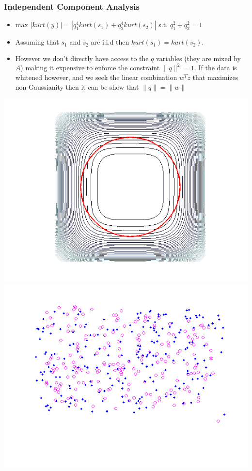 \documentclass{beamer}
\begin{document}
\begin{frame} 
\frametitle{Independent Component Analysis} 
\begin{itemize}
\item{max $|kurt(y)| = |q_1 ^ 4 kurt(s_1) + q_2 ^ 4kurt(s_2)|$ s.t. $q_1 ^ 2 + q_2 ^2 = 1$} 
\item{Assuming that $s_1$ and $s_2$ are i.i.d then $kurt(s_1) = kurt(s_2)$}. 
\item{However we don't directly have access to the $q$ variables (they are mixed by $A$) making it expensive to enforce the constraint $\|q\|^2 =1$. If the data is whitened however, and we seek the linear combination $w^Tz$ that maximizes non-Gaussianity then it can be show that $\|q\| = \|w\|$} 
\end{itemize}
\begin{center}
\includegraphics[scale = 0.3]{ICA.png}
\includegraphics[scale = 0.3]{ICAresult1.png}
\end{center}
\end{frame} 
\end{document}
